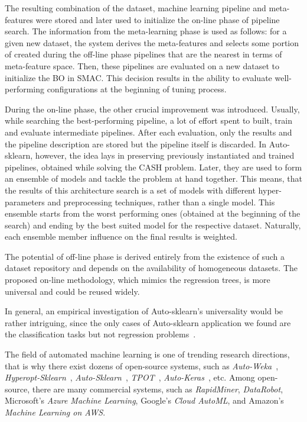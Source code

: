 The resulting combination of the dataset, machine learning pipeline and meta-features were stored and later used to initialize the on-line phase of pipeline search.
The information from the meta-learning phase is used as follows: for a given new dataset, the system derives the meta-features and selects some portion of created during the off-line phase pipelines that are the nearest in terms of meta-feature space. Then, these pipelines are evaluated on a new dataset to initialize the BO in SMAC. This decision results in the ability to evaluate well-performing configurations at the beginning of tuning process.

During the on-line phase, the other crucial improvement was introduced. 
Usually, while searching the best-performing pipeline, a lot of effort spent to built, train and evaluate intermediate pipelines. After each evaluation, only the results and the pipeline description are stored but the pipeline itself is discarded. In Auto-sklearn, however, the idea lays in preserving previously instantiated and trained pipelines, obtained while solving the CASH problem. Later, they are used to form an ensemble of models and tackle the problem at hand together. This means, that the results of this architecture search is a set of models with different hyper-parameters and preprocessing techniques, rather than a single model. This ensemble starts from the worst performing ones (obtained at the beginning of the search) and ending by the best suited model for the respective dataset. Naturally, each ensemble member influence on the final results is weighted.

The potential of off-line phase is derived entirely from the existence of such a dataset repository and depends on the availability of homogeneous datasets. The proposed on-line methodology, which mimics the regression trees, is more universal and could be reused widely.

In general, an empirical investigation of Auto-sklearn's universality would be rather intriguing, since the only cases of Auto-sklearn application we found are the classification tasks but not regression problems~\cite{feurer2015efficient,biedenkapp-ecai20}.

The field of automated machine learning is one of trending research directions, that is why there exist dozens of open-source systems, such as \textit{Auto-Weka}~\cite{thornton2013auto}, \textit{Hyperopt-Sklearn}~\cite{komer2014hyperopt}, \textit{Auto-Sklearn}~\cite{feurer2015efficient}, \textit{TPOT}~\cite{olson2019tpot}, \textit{Auto-Keras}~\cite{jin2019auto}, etc. Among open-source, there are many commercial systems, such as \textit{RapidMiner}, \textit{DataRobot}, Microsoft’s \textit{Azure Machine Learning}, Google’s \textit{Cloud AutoML}, and Amazon's \textit{Machine Learning on AWS}.


